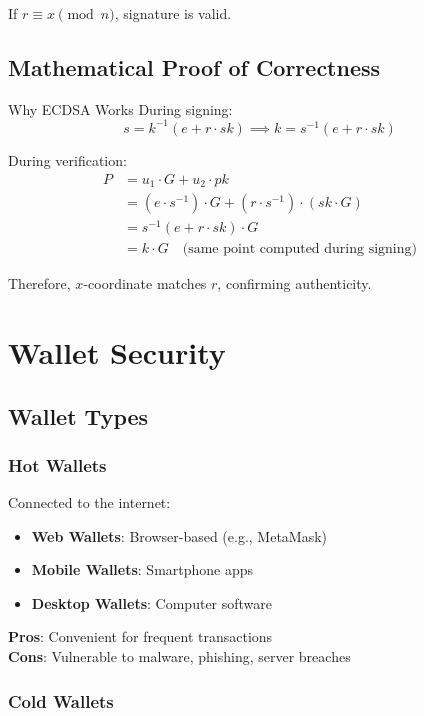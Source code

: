 \documentclass[11pt,a4paper]{article}
\begin{document}
If $r \equiv x \pmod{n}$, signature is valid.

\subsection{Mathematical Proof of Correctness}

\begin{keybox}{Why ECDSA Works}
During signing:
\[
s = k^{-1}(e + r \cdot sk) \implies k = s^{-1}(e + r \cdot sk)
\]

During verification:
\begin{align*}
P &= u_1 \cdot G + u_2 \cdot pk \\
  &= (e \cdot s^{-1}) \cdot G + (r \cdot s^{-1}) \cdot (sk \cdot G) \\
  &= s^{-1}(e + r \cdot sk) \cdot G \\
  &= k \cdot G \quad \text{(same point computed during signing)}
\end{align*}

Therefore, $x$-coordinate matches $r$, confirming authenticity.
\end{keybox}

\section{Wallet Security}

\subsection{Wallet Types}

\subsubsection{Hot Wallets}

Connected to the internet:
\begin{itemize}
  \item \textbf{Web Wallets}: Browser-based (e.g., MetaMask)
  \item \textbf{Mobile Wallets}: Smartphone apps
  \item \textbf{Desktop Wallets}: Computer software
\end{itemize}

\textbf{Pros}: Convenient for frequent transactions \\
\textbf{Cons}: Vulnerable to malware, phishing, server breaches

\subsubsection{Cold Wallets}
\end{document}
